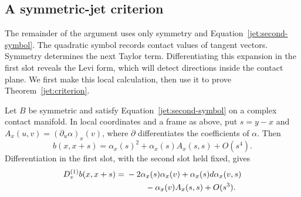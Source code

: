 \subsection{A symmetric-jet criterion}

The remainder of the argument uses only symmetry and
Equation~\eqref{jet:second-symbol}. The quadratic symbol records contact
values of tangent vectors. Symmetry determines the next Taylor term.
Differentiating this expansion in the first slot reveals the Levi form,
which will detect directions inside the contact plane. We first make this local
calculation, then use it to prove Theorem~\ref{jet:criterion}.

\begin{lemma}\label{jet:local-calculation}
Let $B$ be symmetric and satisfy Equation~\eqref{jet:second-symbol}
on a complex contact manifold. In local coordinates and a frame
as above, put $s=y-x$ and
$A_x(u,v)=(\partial_u\alpha)_x(v)$, where $\partial$ differentiates
the coefficients of $\alpha$. Then
\begin{equation}\label{jet:cubic}
b(x,x+s)=\alpha_x(s)^2+\alpha_x(s)A_x(s,s)+O(s^4).
\end{equation}
Differentiation in the first slot, with the second slot held
fixed, gives
\begin{equation}\label{jet:fixed-second}
\begin{split}
D^{(1)}_v b(x,x+s)
={}&-2\alpha_x(s)\alpha_x(v)
   +\alpha_x(s)d\alpha_x(v,s)\\
 &\hspace{8mm}-\alpha_x(v)A_x(s,s)+O(s^3).
\end{split}
\end{equation}
\end{lemma}

